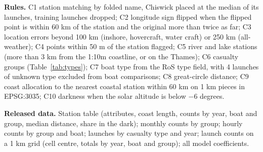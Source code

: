 \documentclass[11pt,a4paper]{article}
\begin{document}
\textbf{Rules.} C1 station matching by folded name, Chiswick placed at the median of its launches, training launches dropped; C2 longitude sign flipped when the flipped point is within 60 km of the station and the original more than twice as far; C3 location errors beyond 100 km (inshore, hovercraft, water craft) or 250 km (all-weather); C4 points within 50 m of the station flagged; C5 river and lake stations (more than 3 km from the 1:10m coastline, or on the Thames); C6 casualty groups (Table~\ref{tab:types}); C7 boat type from the RoS type field, with 4 launches of unknown type excluded from boat comparisons; C8 great-circle distance; C9 coast allocation to the nearest coastal station within 60 km on 1 km pieces in EPSG:3035; C10 darkness when the solar altitude is below $-6$ degrees.

\textbf{Released data.} Station table (attributes, coast length, counts by year, boat and group, median distance, share in the dark); monthly counts by group; hourly counts by group and boat; launches by casualty type and year; launch counts on a 1 km grid (cell centre, totals by year, boat and group); all model coefficients.
\end{document}
